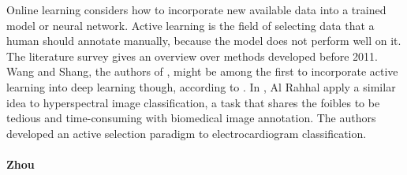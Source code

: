 Online learning considers how to incorporate new available data into a trained model or neural network. Active learning is the field of selecting data that a human should annotate manually, because the model does not perform well on it. The literature survey \cite{activesurvey} gives an overview over methods developed before 2011. Wang and Shang, the authors of \cite{dwang}, might be among the first to incorporate active learning into deep learning though, according to \cite{zhou}. In \cite{hyperspectral}, Al Rahhal \etal apply a similar idea to hyperspectral image classification, a task that shares the foibles to be tedious and time-consuming with biomedical image annotation. The authors developed an active selection paradigm to electrocardiogram classification. 

\paragraph{Zhou \etal}

